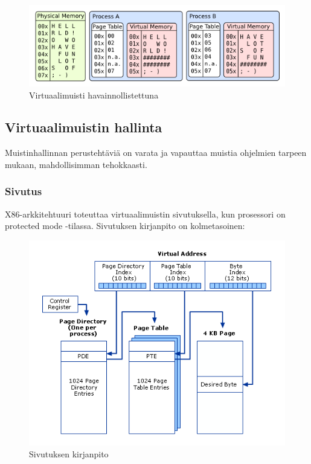 \begin{figure}[H]
\centering
\includegraphics[width=\textwidth]{../figures/virtual_memory.png}
\caption{Virtuaalimuisti havainnollistettuna}
\label{fig:virtual_memory}
\end{figure}

\subsection{Virtuaalimuistin hallinta}

Muistinhallinnan perustehtäviä on varata ja vapauttaa muistia ohjelmien tarpeen mukaan, mahdollisimman tehokkaasti.

\subsubsection{Sivutus}

X86-arkkitehtuuri toteuttaa virtuaalimuistin sivutuksella, kun prosessori on protected mode -tilassa. Sivutuksen kirjanpito on kolmetasoinen:
\begin{figure}[H]
\centering
\includegraphics[width=\textwidth]{../figures/paging.png}
\caption{Sivutuksen kirjanpito}
\label{fig:paging}
\end{figure}

